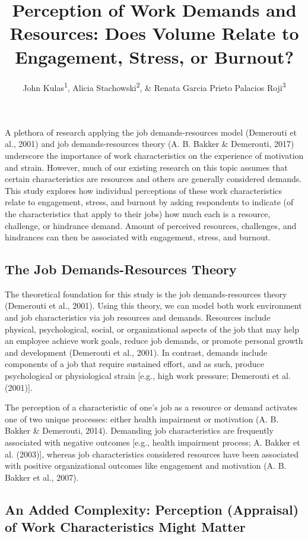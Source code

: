\documentclass[
  man]{apa6}
\title{Perception of Work Demands and Resources: Does Volume Relate to Engagement, Stress, or Burnout?}
\author{John Kulas\textsuperscript{1}, Alicia Stachowski\textsuperscript{2}, \& Renata Garcia Prieto Palacios Roji\textsuperscript{3}}
\date{}
\affiliation{\vspace{0.5cm}\textsuperscript{1} eRg\\\textsuperscript{2} University of Wisconsin - Stout\\\textsuperscript{3} PepsiCo}
\begin{document}
\maketitle

A plethora of research applying the job demands-resources model (Demerouti et al., 2001) and job demands-resources theory (A. B. Bakker \& Demerouti, 2017) underscore the importance of work characteristics on the experience of motivation and strain. However, much of our existing research on this topic assumes that certain characteristics are resources and others are generally considered demands. This study explores how individual perceptions of these work characteristics relate to engagement, stress, and burnout by asking respondents to indicate (of the characteristics that apply to their jobs) how much each is a resource, challenge, or hindrance demand. Amount of perceived resources, challenges, and hindrances can then be associated with engagement, stress, and burnout.

\hypertarget{the-job-demands-resources-theory}{%
\subsection{The Job Demands-Resources Theory}\label{the-job-demands-resources-theory}}

The theoretical foundation for this study is the job demands-resources theory (Demerouti et al., 2001). Using this theory, we can model both work environment and job characteristics via job resources and demands. Resources include physical, psychological, social, or organizational aspects of the job that may help an employee achieve work goals, reduce job demands, or promote personal growth and development (Demerouti et al., 2001). In contrast, demands include components of a job that require sustained effort, and as such, produce psychological or physiological strain {[}e.g., high work pressure; Demerouti et al. (2001){]}.

The perception of a characteristic of one's job as a resource or demand activates one of two unique processes: either health impairment or motivation (A. B. Bakker \& Demerouti, 2014). Demanding job characteristics are frequently associated with negative outcomes {[}e.g., health impairment process; A. Bakker et al. (2003){]}, whereas job characteristics considered resources have been associated with positive organizational outcomes like engagement and motivation (A. B. Bakker et al., 2007).

\hypertarget{an-added-complexity-perception-appraisal-of-work-characteristics-might-matter}{%
\subsection{An Added Complexity: Perception (Appraisal) of Work Characteristics Might Matter}\label{an-added-complexity-perception-appraisal-of-work-characteristics-might-matter}}
\end{document}

